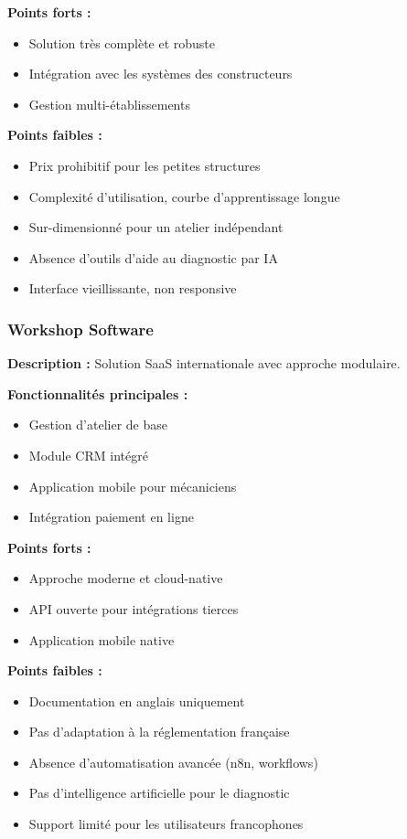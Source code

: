 \textbf{Points forts :}
\begin{itemize}
    \item Solution très complète et robuste
    \item Intégration avec les systèmes des constructeurs
    \item Gestion multi-établissements
\end{itemize}

\textbf{Points faibles :}
\begin{itemize}
    \item Prix prohibitif pour les petites structures
    \item Complexité d'utilisation, courbe d'apprentissage longue
    \item Sur-dimensionné pour un atelier indépendant
    \item Absence d'outils d'aide au diagnostic par IA
    \item Interface vieillissante, non responsive
\end{itemize}

\subsubsection{Workshop Software}

\textbf{Description :} Solution SaaS internationale avec approche modulaire.

\textbf{Fonctionnalités principales :}
\begin{itemize}
    \item Gestion d'atelier de base
    \item Module CRM intégré
    \item Application mobile pour mécaniciens
    \item Intégration paiement en ligne
\end{itemize}

\textbf{Points forts :}
\begin{itemize}
    \item Approche moderne et cloud-native
    \item API ouverte pour intégrations tierces
    \item Application mobile native
\end{itemize}

\textbf{Points faibles :}
\begin{itemize}
    \item Documentation en anglais uniquement
    \item Pas d'adaptation à la réglementation française
    \item Absence d'automatisation avancée (n8n, workflows)
    \item Pas d'intelligence artificielle pour le diagnostic
    \item Support limité pour les utilisateurs francophones
\end{itemize}

